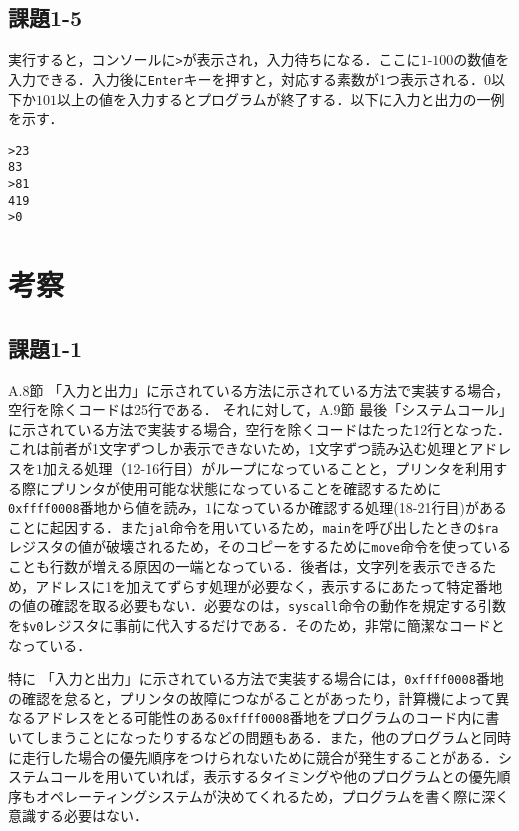 \subsection{課題1-5}
実行すると，コンソールに\verb|>|が表示され，入力待ちになる．ここに$1$-$100$の数値を入力できる．入力後に\verb|Enter|キーを押すと，対応する素数が1つ表示される．$0$以下か$101$以上の値を入力するとプログラムが終了する．以下に入力と出力の一例を示す．
\begin{verbatim}
>23
83
>81
419
>0
\end{verbatim}

\section{考察} \label{sec:review}

\subsection{課題1-1}
A.8節 「入力と出力」に示されている方法に示されている方法で実装する場合，空行を除くコードは25行である．
それに対して，A.9節 最後「システムコール」に示されている方法で実装する場合，空行を除くコードはたった12行となった．
これは前者が1文字ずつしか表示できないため，1文字ずつ読み込む処理とアドレスを$1$加える処理（12-16行目）がループになっていることと，プリンタを利用する際にプリンタが使用可能な状態になっていることを確認するために\verb|0xffff0008|番地から値を読み，$1$になっているか確認する処理(18-21行目)があることに起因する．また\verb|jal|命令を用いているため，\verb|main|を呼び出したときの\verb|$ra|レジスタの値が破壊されるため，そのコピーをするために\verb|move|命令を使っていることも行数が増える原因の一端となっている．後者は，文字列を表示できるため，アドレスに1を加えてずらす処理が必要なく，表示するにあたって特定番地の値の確認を取る必要もない．必要なのは，\verb|syscall|命令の動作を規定する引数を\verb|$v0|レジスタに事前に代入するだけである．そのため，非常に簡潔なコードとなっている．

特に 「入力と出力」に示されている方法で実装する場合には，\verb|0xffff0008|番地の確認を怠ると，プリンタの故障につながることがあったり，計算機によって異なるアドレスをとる可能性のある\verb|0xffff0008|番地をプログラムのコード内に書いてしまうことになったりするなどの問題もある．また，他のプログラムと同時に走行した場合の優先順序をつけられないために競合が発生することがある．システムコールを用いていれば，表示するタイミングや他のプログラムとの優先順序もオペレーティングシステムが決めてくれるため，プログラムを書く際に深く意識する必要はない．

